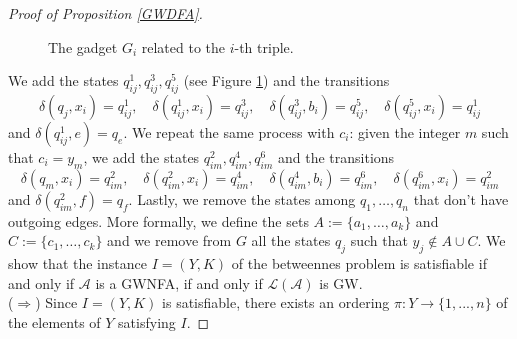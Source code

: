 \documentclass[runningheads]{llncs}
\newcommand{\la}[1]{\mathcal L(\mathcal #1)}
\begin{document}
\begin{proof}[\noindent Proof of Proposition \ref{GWDFA}]
\begin{figure}
\begin{center}
\end{center}
\caption{The gadget $G_i$ related to the $i$-th triple.}
\label{f1}
\end{figure}
We add the states $q^1_{ij},q^3_{ij},q^5_{ij}$ (see Figure \ref{f1}) and the transitions \[ \delta(q_j,x_i) = q^1_{ij},\quad \delta(q^1_{ij},x_i) = q^3_{ij},\quad \delta(q^3_{ij},b_i) = q^5_{ij},\quad \delta(q^5_{ij},x_i) = q^1_{ij} \]
and $\delta(q^1_{ij},e) = q_e$. We repeat the same process with $c_i$: given the integer $m$ such that $c_i=y_{m}$, we add the states $q^2_{im},q^4_{im},q^6_{im}$ and the transitions \[ \delta(q_m,x_i)=q^2_{im},\quad \delta(q^2_{im},x_i)=q^4_{im},\quad\delta(q^4_{im},b_i)=q^6_{im},\quad\delta(q^6_{im},x_i)=q^2_{im} \]
and $\delta(q^2_{im},f)=q_f.$ Lastly, we remove the states among $q_1, \dots,q_n$ that don't have outgoing edges. More formally, we define the sets $A:=\{a_1,\dots,a_k\}$ and $C:=\{c_1,\dots,c_k\}$ and we remove from $G$ all the states $q_j$ such that $y_j\notin A\cup C$. %
%
%
We show that the instance $I=(Y,K)$ of the betweennes problem is satisfiable if and only if $\mathcal A$ is a GWNFA, if and only if $\la A$ is GW.\\
($\Longrightarrow$) Since $I=(Y,K)$ is satisfiable, there exists an ordering $\pi:Y\rightarrow \{1,...,n\}$ of the elements of $Y$ satisfying $I$. %

\end{proof}
\end{document}
